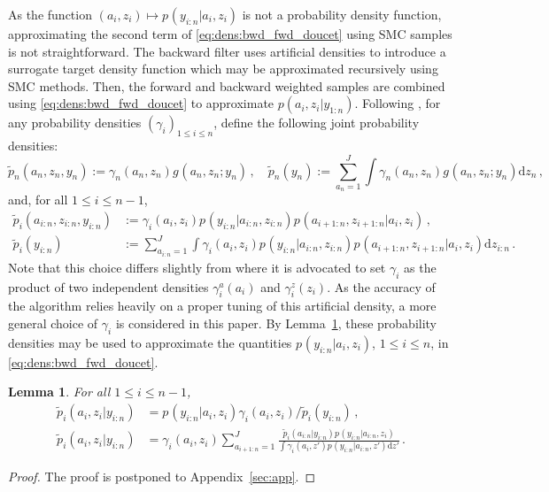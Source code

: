 \documentclass[nolayout]{article}
\theoremstyle{plain}
\newtheorem{lemma}[lemma]{Lemma}
\theoremstyle{definition}
\newcommand{\1}{\mathbbm{1}}
\def\rmd{\mathrm{d}}
\def\eqsp{\,}
\newcommand{\eqdef}{\ensuremath{:=}}
\begin{document}
As the function $(a_{i},z_{i})\mapsto p_{}(y_{i:n}|a_{i},z_{i})$ is not a probability density function, approximating the second term of \eqref{eq:dens:bwd_fwd_doucet}  using SMC samples is not straightforward. The backward filter uses artificial densities to introduce a surrogate target density function which may be approximated recursively using SMC methods. Then, the forward and backward weighted samples are combined using \eqref{eq:dens:bwd_fwd_doucet} to approximate $p(a_{i},z_{i}|y_{1:n})$. Following \cite{briers:doucet:maskell:2010}, for any probability densities $(\gamma^{}_{i})_{1\le i \le n}$, define the following joint probability densities:
\[
\tilde{p}_{n}(a_n,z_n,y_n) \eqdef \gamma^{}_{n}(a_n,z_n)g_{}(a_n,z_n;y_n)\eqsp,\quad \tilde{p}_{n}(y_n)\eqdef \sum_{a_n=1}^J\int \gamma^{}_{n}(a_n,z_n)g_{}(a_n,z_n;y_n)\rmd z_n\eqsp,
\]
and, for all $1\le i\le n-1$,
\begin{align*}
\tilde{p}_{i}(a_{i:n},z_{i:n},y_{i:n}) &\eqdef \gamma^{}_{i}(a_i,z_i)p_{}(y_{i:n}|a_{i:n},z_{i:n})p_{}(a_{i+1:n},z_{i+1:n}|a_i,z_i)\eqsp,\\
\tilde{p}_{i}(y_{i:n})&\eqdef \sum_{a_{i:n}=1}^J\int \gamma^{}_{i}(a_i,z_i)p_{}(y_{i:n}|a_{i:n},z_{i:n})p_{}(a_{i+1:n},z_{i+1:n}|a_i,z_i)\rmd z_{i:n}\eqsp.
\end{align*}
Note that this choice differs slightly from \cite{briers:doucet:maskell:2010} where it is advocated to set $\gamma^{}_i$ as the product of two independent densities $\gamma_i^{a}(a_i)$ and $\gamma_i^{z}(z_i)$. As the accuracy of the algorithm relies heavily on a proper tuning of this artificial density, a more general choice of $\gamma^{}_i$ is considered in this paper. 
By Lemma~\ref{eq:technical:twofilter}, these probability densities may be used to approximate the quantities $p_{}(y_{i:n}|a_{i},z_{i})$, $1\le i \le n$, in \eqref{eq:dens:bwd_fwd_doucet}.
\begin{lemma}
\label{eq:technical:twofilter}
For all $1\le i \le n-1$,
\begin{align}
\tilde{p}_{i}(a_i,z_i|y_{i:n}) &= p_{}(y_{i:n}|a_i,z_i)\gamma^{}_{i}(a_i,z_i)/\tilde{p}_{i}(y_{i:n})\eqsp,\label{eq:p:y1:n}\\
\tilde{p}_{i}(a_{i},z_{i}|y_{i:n}) &= \gamma^{}_i(a_i,z_i)\sum_{a_{i+1:n}=1}^J\frac{\tilde{p}_{i}(a_{i:n}|y_{i:n})p_{}(y_{i:n}|a_{i:n},z_{i})}{\int \gamma^{}_{i}(a_i,z')p_{}(y_{i:n}|a_{i:n},z')\rmd z'}\label{eq:p:ai:zi}\eqsp.
\end{align}
\end{lemma}
\begin{proof}
The proof is postponed to Appendix~\ref{sec:app}.
\end{proof}
\end{document}
